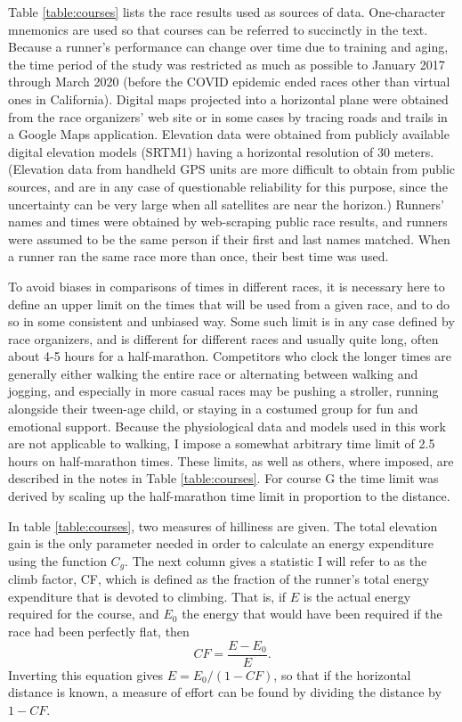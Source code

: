 \documentclass[10pt,letterpaper]{article}
\begin{document}
Table \ref{table:courses} lists the race results used as sources of data.
One-character mnemonics are used so that courses can be referred to succinctly in the text.
Because a runner's performance can change over time due to training and aging,
the time period of the study was restricted as much as possible to January 2017 through March 2020
(before the COVID epidemic ended races other than virtual ones in California).
Digital maps projected into a horizontal plane were obtained from the race organizers' web site
or in some cases by tracing roads and trails in a Google Maps application. Elevation data
were obtained from publicly available digital elevation models (SRTM1) having a horizontal
resolution of 30 meters. (Elevation data from handheld GPS units are more difficult to
obtain from public sources, and are in any case of questionable reliability
for this purpose, since the uncertainty can be very large when all satellites are near the
horizon.) Runners' names and times were obtained by web-scraping public race results,
and runners were assumed to be the same person if their first and last names matched.
When a runner ran the same race more than once, their best time was used.

To avoid biases in comparisons of times in different races, it is necessary here to define
an upper limit on the times that will be used from a given race, and to do so in some
consistent and unbiased way. Some such limit is in any case
defined by race organizers, and is different for different races and usually quite long,
often about 4-5 hours for a half-marathon. Competitors who clock the longer times are generally
either walking the entire race or alternating between walking and jogging, and especially in
more casual races may be pushing a stroller, running alongside their tween-age child, or staying
in a costumed group for fun and emotional support. Because the physiological data and models
used in this work are not applicable to walking, I impose a somewhat arbitrary time limit of 2.5 hours
on half-marathon times. These limits, as well as others, where imposed,
are described in the notes in Table \ref{table:courses}. For course G the time limit was derived by
scaling up the half-marathon time limit in proportion to the distance.

In table \ref{table:courses}, two measures of hilliness are given. The total elevation gain
is the only parameter needed in order to calculate an energy expenditure using the function
$C_g$. The next column gives a statistic I will refer to as the climb factor, CF, which is
defined as the fraction of the runner's total energy expenditure that is devoted to climbing.
That is, if $E$ is the actual energy required for the course, and $E_0$ the energy that
would have been required if the race had been perfectly flat, then 
\begin{equation}
  CF=\frac{E-E_0}{E}.
\end{equation}
Inverting this equation gives $E=E_0/(1-CF)$, so that if the horizontal distance is
known, a measure of effort can be found by dividing the distance by $1-CF$.
\end{document}
